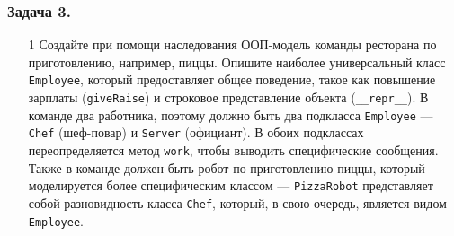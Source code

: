 \subsubsection{Задача 3.}  
\begin{enumerate}
    \item[1]
Создайте при помощи наследования ООП-модель команды ресторана по приготовлению, например, пиццы. Опишите наиболее универсальный класс \texttt{Employee}, который предоставляет общее поведение, такое как повышение зарплаты (\texttt{giveRaise}) и строковое представление объекта (\texttt{\_\_repr\_\_}). В команде два работника, поэтому должно быть два подкласса \texttt{Employee} — \texttt{Chef} (шеф-повар) и \texttt{Server} (официант). В обоих подклассах переопределяется метод \texttt{work}, чтобы выводить специфические сообщения. Также в команде должен быть робот по приготовлению пиццы, который моделируется более специфическим классом — \texttt{PizzaRobot} представляет собой разновидность класса \texttt{Chef}, который, в свою очередь, является видом \texttt{Employee}.


\end{enumerate}
